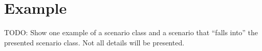 \section{Example}
\label{sec:example}

\color{red}

TODO: Show one example of a scenario class and a scenario that ``falls into'' the presented scenario class. Not all details will be presented.

\color{black}